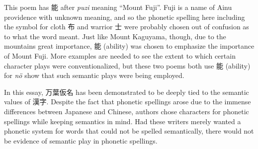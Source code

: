 \par{ This poem has 能 after \emph{puzi }meaning “Mount Fuji”. Fuji is a name of Ainu providence with unknown meaning, and so the phonetic spelling here including the symbol for cloth 布 and warrior 士 were probably chosen out of confusion as to what the word meant. Just like Mount Kaguyama, though, due to the mountain\textquotesingle s great importance, 能 (ability) was chosen to emphasize the importance of Mount Fuji. More examples are needed to see the extent to which certain character plays were conventionalized, but these two poems both use 能 (ability) for \emph{nö }show that such semantic plays were being employed. }

\par{ In this essay, 万葉仮名 has been demonstrated to be deeply tied to the semantic values of 漢字. Despite the fact that phonetic spellings arose due to the immense differences between Japanese and Chinese, authors chose characters for phonetic spellings while keeping semantics in mind. Had these writers merely wanted a phonetic system for words that could not be spelled semantically, there would not be evidence of semantic play in phonetic spellings. }
     